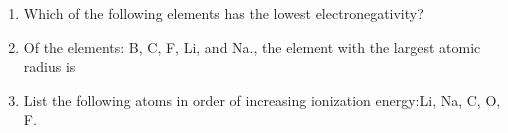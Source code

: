 \documentclass[main.tex]{subfiles}
\begin{document}
\begin{fullwidth}
\begin{multicols*}{2}
\begin{enumerate}
\item Which of the following elements has the lowest electronegativity?
\begin{enumerate}[label=(\alph*)]\vspace{-0.5cm}
\end{enumerate}\vspace{-0.5cm}


 


\item Of the elements:  B, C, F, Li, and Na., the element with the largest atomic radius is
\begin{enumerate}[label=(\alph*)]\vspace{-0.5cm}
\end{enumerate}\vspace{-0.5cm}

\item List the following atoms in order of increasing ionization energy:Li, Na, C, O, F.
\begin{enumerate}[label=(\alph*)]\vspace{-0.5cm}
\end{enumerate}\vspace{-0.5cm}
%









 



\end{enumerate}\end{multicols*}

\end{fullwidth}
\end{document}
